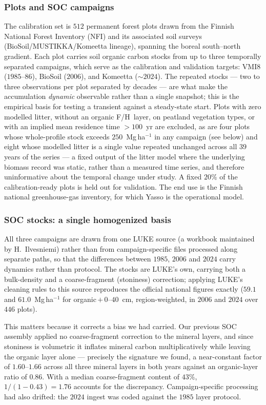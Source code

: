 \documentclass[11pt]{article}
\begin{document}
\subsubsection{Plots and SOC campaigns}
The calibration set is $512$ permanent forest plots drawn from the Finnish
National Forest Inventory (NFI) and its associated soil surveys
(BioSoil/MUSTIKKA/Komeetta lineage), spanning the boreal south--north gradient.
Each plot carries soil organic carbon stocks from up to three
temporally separated campaigns, which serve as the calibration and validation
targets: VMI8 ($1985$--$86$), BioSoil ($2006$), and Komeetta ($\sim\!2024$).
The repeated stocks --- two to three observations per plot separated by decades
--- are what make the accumulation \emph{dynamic} observable rather than a
single snapshot; this is the empirical basis for testing a transient against a
steady-state start. Plots with zero modelled litter, without an organic
F/H~layer, on peatland vegetation types, or with an implied mean residence time
$>100$~yr are excluded, as are four plots whose whole-profile stock exceeds
$250$~Mg\,ha$^{-1}$ in any campaign (see below) and eight whose modelled litter is a
single value repeated unchanged across all $39$ years of the series --- a fixed output of
the litter model where the underlying biomass record was static, rather than a measured
time series, and therefore uninformative about the temporal change under study. A fixed $20\%$ of the
calibration-ready plots is held out for validation. The
end use is the Finnish national greenhouse-gas inventory, for which Yasso is the
operational model.

\subsubsection{SOC stocks: a single homogenized basis}\label{sec:socdata}
All three campaigns are drawn from one LUKE source (a workbook maintained by
H.~Ilvesniemi) rather than from campaign-specific files processed along separate
paths, so that the differences between $1985$, $2006$ and $2024$ carry dynamics
rather than protocol. The stocks are LUKE's own, carrying both a bulk-density and
a coarse-fragment (stoniness) correction; applying LUKE's cleaning rules to this
source reproduces the official national figures exactly ($59.1$ and
$61.0$~Mg\,ha$^{-1}$ for organic\,$+$\,$0$--$40$~cm, region-weighted, in $2006$
and $2024$ over $446$ plots).

This matters because it corrects a bias we had carried. Our previous SOC
assembly applied no coarse-fragment correction to the mineral layers, and since
stoniness is volumetric it inflates mineral carbon multiplicatively while leaving
the organic layer alone --- precisely the signature we found, a near-constant
factor of $1.60$--$1.66$ across all three mineral layers in both years against an
organic-layer ratio of $0.86$. With a median coarse-fragment content of $43\%$,
$1/(1-0.43)=1.76$ accounts for the discrepancy. Campaign-specific processing had
also drifted: the $2024$ ingest was coded against the $1985$ layer protocol.
\end{document}
